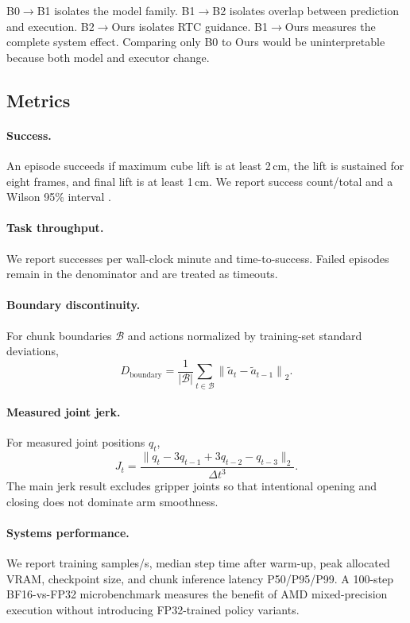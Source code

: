 \documentclass[10pt,twocolumn]{article}
\begin{document}
B0$\rightarrow$B1 isolates the model family.  B1$\rightarrow$B2 isolates
overlap between prediction and execution.  B2$\rightarrow$Ours isolates RTC
guidance.  B1$\rightarrow$Ours measures the complete system effect.  Comparing
only B0 to Ours would be uninterpretable because both model and executor
change.

\subsection{Metrics}

\paragraph{Success.}
An episode succeeds if maximum cube lift is at least 2\,cm, the lift is
sustained for eight frames, and final lift is at least 1\,cm.  We report
success count/total and a Wilson 95\% interval \cite{wilson1927interval}.

\paragraph{Task throughput.}
We report successes per wall-clock minute and time-to-success.  Failed episodes
remain in the denominator and are treated as timeouts.

\paragraph{Boundary discontinuity.}
For chunk boundaries $\mathcal{B}$ and actions normalized by training-set
standard deviations,
\begin{equation}
  D_{\mathrm{boundary}} =
  \frac{1}{|\mathcal{B}|}\sum_{t\in\mathcal{B}}
  \left\|\tilde a_t-\tilde a_{t-1}\right\|_2.
\end{equation}

\paragraph{Measured joint jerk.}
For measured joint positions $q_t$,
\begin{equation}
  J_t = \frac{\|q_t-3q_{t-1}+3q_{t-2}-q_{t-3}\|_2}{\Delta t^3}.
\end{equation}
The main jerk result excludes gripper joints so that intentional opening and
closing does not dominate arm smoothness.

\paragraph{Systems performance.}
We report training samples/s, median step time after warm-up, peak allocated
VRAM, checkpoint size, and chunk inference latency P50/P95/P99.  A 100-step
BF16-vs-FP32 microbenchmark measures the benefit of AMD mixed-precision
execution without introducing FP32-trained policy variants.
\end{document}
